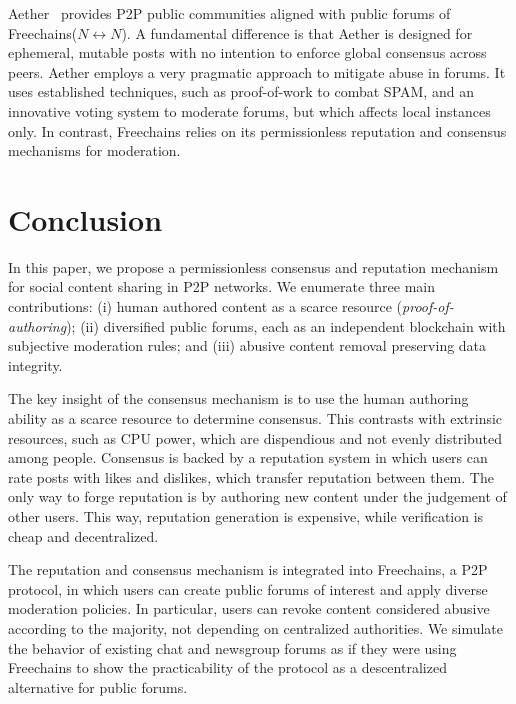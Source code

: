 \documentclass[12pt]{article}
\newcommand{\FC}       {Freechains\xspace}
\newcommand{\Xnn} {$N{\leftrightarrow}N$\xspace}
\begin{document}
Aether~\cite{p2p.ecosystem} provides P2P public communities aligned with public
forums of \FC (\Xnn).
A fundamental difference is that Aether is designed for ephemeral, mutable
posts with no intention to enforce global consensus across peers.
Aether employs a very pragmatic approach to mitigate abuse in forums.
It uses established techniques, such as proof-of-work to combat SPAM, and an
innovative voting system to moderate forums, but which affects local instances
only.
In contrast, \FC relies on its permissionless reputation and consensus
mechanisms for moderation.

\section{Conclusion}
\label{sec.conclusion}

In this paper, we propose a permissionless consensus and reputation mechanism
for social content sharing in P2P networks.
We enumerate three main contributions:
    (i)   human authored content as a scarce resource
          (\emph{proof-of-authoring});
    (ii)  diversified public forums, each as an independent blockchain with
          subjective moderation rules; and
    (iii) abusive content removal preserving data integrity.

The key insight of the consensus mechanism is to use the human authoring
ability as a scarce resource to determine consensus.
This contrasts with extrinsic resources, such as CPU power, which are
dispendious and not evenly distributed among people.
%
Consensus is backed by a reputation system in which users can rate posts with
likes and dislikes, which transfer reputation between them.
The only way to forge reputation is by authoring new content under the
judgement of other users.
This way, reputation generation is expensive, while verification is cheap and
decentralized.

The reputation and consensus mechanism is integrated into \FC, a P2P protocol,
in which users can create public forums of interest and apply diverse
moderation policies.
In particular, users can revoke content considered abusive according to the
majority, not depending on centralized authorities.
%
We simulate the behavior of existing chat and newsgroup forums as if they were
using \FC to show the practicability of the protocol as a descentralized
alternative for public forums.
\end{document}
